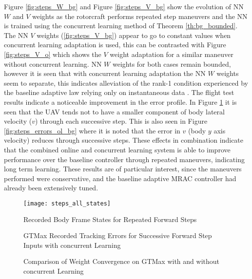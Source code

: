 Figure \ref{fig:steps_W_bg} and Figure \ref{fig:steps_V_bg} show the evolution of NN $W$ and $V$ weights as the rotorcraft performs repeated step maneuvers and the NN is trained using the concurrent learning method of Theorem \ref{th:bg_bounded}. The NN $V$ weights (\ref{fig:steps_V_bg}) appear to go to constant values when concurrent learning adaptation is used, this can be contrasted with Figure \ref{fig:steps_V_o} which shows the $V$ weight adaptation for a similar maneuver without concurrent learning. NN $W$ weights for both cases remain bounded, however it is seen that with concurrent learning adaptation the NN $W$ weights seem to separate, this indicates alleviation of the rank-1 condition experienced by the baseline adaptive law relying only on instantaneous data \cite{Chowdhary:JGCD:10}. The flight test results indicate a noticeable improvement in the error profile. In Figure \ref{fig:steps_all_states} it is seen that the UAV tends not to have a smaller component of body lateral velocity ($v$) through each successive step. This is also seen in Figure \ref{fig:steps_errors_ol_bg}  where it is noted that the error in $v$ (body $y$ axis velocity) reduces through successive steps.  These effects in combination indicate that the combined online and concurrent learning system is able to improve performance over the baseline controller through repeated maneuvers, indicating long term learning.  These results are of particular interest, since the maneuvers performed were conservative, and the baseline adaptive MRAC controller had already been extensively tuned.



\begin{figure}[H]
\centering
\texttt{[image: steps\_all\_states]}
\caption{Recorded Body Frame States for Repeated Forward Steps}
\label{fig:steps_all_states}
\end{figure}

\begin{figure}[H]
\centering
{}
\caption{GTMax Recorded Tracking Errors for Successive Forward Step Inputs with concurrent Learning}
\label{fig:steps_errors}
\end{figure}


\begin{figure}[H]
\centering
{}
\caption{Comparison of Weight Convergence on GTMax with and without concurrent Learning}
\label{fig:steps_weights}
\end{figure}

